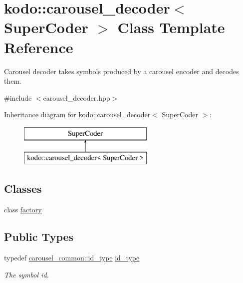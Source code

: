 \hypertarget{classkodo_1_1carousel__decoder}{\section{kodo\-:\-:carousel\-\_\-decoder$<$ Super\-Coder $>$ Class Template Reference}
\label{classkodo_1_1carousel__decoder}
}


Carousel decoder takes symbols produced by a carousel encoder and decodes them.  




{\ttfamily \#include $<$carousel\-\_\-decoder.\-hpp$>$}

Inheritance diagram for kodo\-:\-:carousel\-\_\-decoder$<$ Super\-Coder $>$\-:\begin{figure}[H]
\begin{center}
\leavevmode
\includegraphics[height=2.000000cm]{classkodo_1_1carousel__decoder}
\end{center}
\end{figure}
\subsection*{Classes}
\begin{DoxyCompactItemize}
\item 
class \hyperlink{classkodo_1_1carousel__decoder_1_1factory}{factory}
\end{DoxyCompactItemize}
\subsection*{Public Types}
\begin{DoxyCompactItemize}
\item 
\hypertarget{classkodo_1_1carousel__decoder_a8446993ce8507a96150d9d667fc2fb24}{typedef \hyperlink{classkodo_1_1carousel__common_aff8e05bd881924ffbfb317d778ff2de6}{carousel\-\_\-common\-::id\-\_\-type} \hyperlink{classkodo_1_1carousel__decoder_a8446993ce8507a96150d9d667fc2fb24}{id\-\_\-type}}\label{classkodo_1_1carousel__decoder_a8446993ce8507a96150d9d667fc2fb24}

\begin{DoxyCompactList}\small\item\em The symbol id. \end{DoxyCompactList}\end{DoxyCompactItemize}
